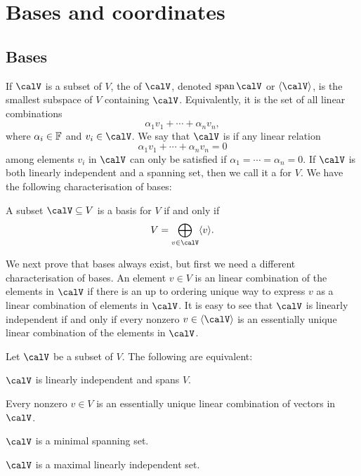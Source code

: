 \chapter{Bases and coordinates}

\section{Bases}

If $\calV$ is a subset of $V$, the  of $\calV$, denoted $\Span\calV$ or $\gen{\calV}$, is the smallest subspace of $V$ containing $\calV$. Equivalently, it is the set of all linear combinations
%
\begin{equation*}
    \alpha_1 v_1 + \cdots + \alpha_n v_n,
\end{equation*}
%
where $\alpha_i \in \mathbb{F}$ and $v_i \in \calV$. We say that $\calV$ is  if any linear relation
%
\begin{equation*}
    \alpha_1 v_1 + \cdots + \alpha_n v_n = 0
\end{equation*}
%
among elements $v_i$ in $\calV$ can only be satisfied if $\alpha_1 = \cdots = \alpha_n = 0$. If $\calV$ is both linearly independent and a spanning set, then we call it a  for $V$. We have the following characterisation of bases:

\begin{propositionnoproof}
    A subset $\calV \subseteq V$ is a basis for $V$ if and only if
    \begin{equation*}
        V
            = \bigdirsum_{v \in \calV} \gen{v}.
    \end{equation*}
\end{propositionnoproof}

We next prove that bases always exist, but first we need a different characterisation of bases. An element $v \in V$ is an  linear combination of the elements in $\calV$ if there is an up to ordering unique way to express $v$ as a linear combination of elements in $\calV$. It is easy to see that $\calV$ is linearly independent if and only if every nonzero $v \in \gen{\calV}$ is an essentially unique linear combination of the elements in $\calV$.

\begin{proposition}
    Let $\calV$ be a subset of $V$. The following are equivalent:
    \begin{enumproposition}
        \item \label{enum:linearly-independent-and-span} $\calV$ is linearly independent and spans $V$.
        \item \label{enum:essentially-unique-linear-combination} Every nonzero $v \in V$ is an essentially unique linear combination of vectors in $\calV$.
        \item \label{enum:minimal-spanning-set} $\calV$ is a minimal spanning set.
        \item \label{enum:maximal-linearly-independent-set} $\calV$ is a maximal linearly independent set.
    \end{enumproposition}
\end{proposition}

